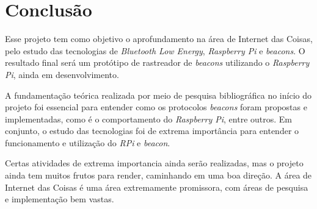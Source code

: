 \documentclass[
		12pt,				%
		openright,			%
		oneside,			%
		a4paper,			%
		chapter=TITLE,		%
		english,			%
		brazil				%
	]{abntex2}
\begin{document}
\chapter{Conclusão}

Esse projeto tem como objetivo o aprofundamento na área de Internet das Coisas, pelo estudo das tecnologias de \textit{Bluetooth Low Energy}, \textit{Raspberry Pi} e \textit{beacons}. O resultado final será um protótipo de rastreador de \textit{beacons} utilizando o \textit{Raspberry Pi}, ainda em desenvolvimento.

A fundamentação teórica realizada por meio de pesquisa bibliográfica no início do projeto foi essencial para entender como os protocolos \textit{beacons} foram propostas e implementadas, como é o comportamento do \textit{Raspberry Pi}, entre outros. Em conjunto, o estudo das tecnologias foi de extrema importância para entender o funcionamento e utilização do \textit{RPi} e \textit{beacon}.

Certas atividades de extrema importancia ainda serão realizadas, mas o projeto ainda tem muitos frutos para render, caminhando em uma boa direção. A área de Internet das Coisas é uma área extremamente promissora, com áreas de pesquisa e implementação bem vastas. 








\end{document}
